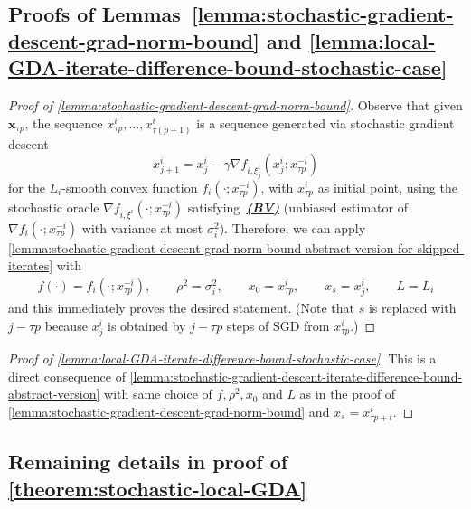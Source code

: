 \documentclass{article}
\newcommand{\vx}{{\mathbf{x}}}
\theoremstyle{plain}
\theoremstyle{remark}
\begin{document}
\subsection{Proofs of Lemmas~\ref{lemma:stochastic-gradient-descent-grad-norm-bound} and \ref{lemma:local-GDA-iterate-difference-bound-stochastic-case}}

\begin{proof}[Proof of \cref{lemma:stochastic-gradient-descent-grad-norm-bound}]

Observe that given $\vx_{\tau p}$, the sequence $x_{\tau p}^i, \dots, x_{\tau (p+1)}^i$ is a sequence generated via stochastic gradient descent
\[
    x_{j+1}^i = x_j^i - \gamma \nabla f_{i,\xi_j^i} (x_j^i; x_{\tau p}^{-i})
\]
for the $L_i$-smooth convex function $f_i(\cdot; x_{\tau p}^{-i})$, with $x_{\tau p}^i$ as initial point, using the stochastic oracle $\nabla f_{i,\xi^i}(\cdot; x_{\tau p}^{-i})$ satisfying~\hyperref[assumption:noise]{\textbf{\emph{(BV)}}} (unbiased estimator of $\nabla f_i(\cdot; x_{\tau p}^{-i})$ with variance at most $\sigma_i^2$).
Therefore, we can apply \cref{lemma:stochastic-gradient-descent-grad-norm-bound-abstract-version-for-skipped-iterates} with 
\begin{align*}
    f(\cdot) = f_i (\cdot; x_{\tau p}^{-i}), \qquad \rho^2 = \sigma_i^2 , \qquad x_0 = x_{\tau p}^i , \qquad x_s = x_j^i , \qquad L = L_i
\end{align*}
and this immediately proves the desired statement.
(Note that $s$ is replaced with $j-\tau p$ because $x_j^i$ is obtained by $j-\tau p$ steps of SGD from $x_{\tau p}^i$.)

\end{proof}

\begin{proof}[Proof of \cref{lemma:local-GDA-iterate-difference-bound-stochastic-case}]

This is a direct consequence of \cref{lemma:stochastic-gradient-descent-iterate-difference-bound-abstract-version} with same choice of $f, \rho^2, x_0$ and $L$ as in the proof of \cref{lemma:stochastic-gradient-descent-grad-norm-bound} and $x_s = x_{\tau p + t}^i$.

\end{proof}

\subsection{Remaining details in proof of \cref{theorem:stochastic-local-GDA}}
\end{document}
